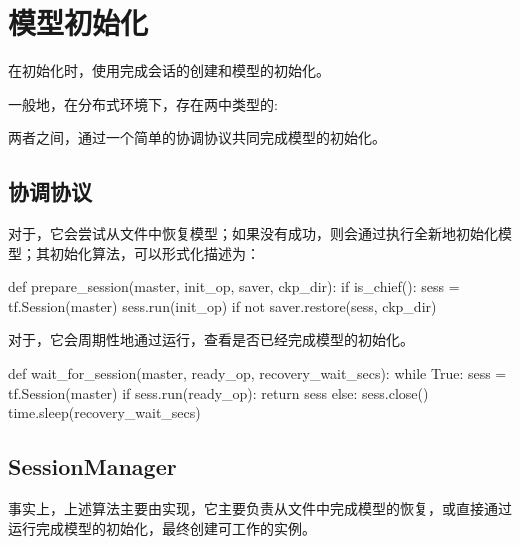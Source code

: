 \section{模型初始化}

\begin{content}

在初始化时，使用完成会话的创建和模型的初始化。

一般地，在分布式环境下，存在两中类型的:

\begin{enum}
\end{enum}

两者之间，通过一个简单的协调协议共同完成模型的初始化。

\subsection{协调协议}

对于，它会尝试从文件中恢复模型；如果没有成功，则会通过执行全新地初始化模型；其初始化算法，可以形式化描述为：

\begin{leftbar}
\begin{python}
def prepare_session(master, init_op, saver, ckp_dir):
  if is_chief():
    sess = tf.Session(master)
    sess.run(init_op) if not saver.restore(sess, ckp_dir)
\end{python}
\end{leftbar}

对于，它会周期性地通过运行，查看是否已经完成模型的初始化。

\begin{leftbar}
\begin{python}
def wait_for_session(master, ready_op, recovery_wait_secs):
  while True:
    sess = tf.Session(master)
    if sess.run(ready_op):
      return sess
    else:
      sess.close()
      time.sleep(recovery_wait_secs)   
\end{python}
\end{leftbar}

\subsection{SessionManager}

事实上，上述算法主要由实现，它主要负责从文件中完成模型的恢复，或直接通过运行完成模型的初始化，最终创建可工作的实例。


\end{content}
